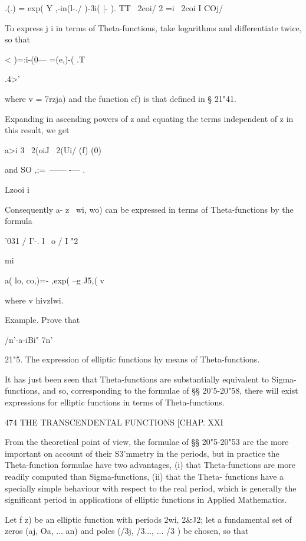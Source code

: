 .(.) = exp( Y ,-in(l-./ )-3i( |- ). TT \ 2coi/ 2 =i \ 2coi I COj/

To express j i in terms of Theta-functious, take logarithms and
differentiate twice, so that



 < )=:i-(0— =(e,)-( .T






.4>'

where v = 7rzja) and the function cf) is that defined in § 21"41.

Expanding in ascending powers of z and equating the terms independent
of z in this result, we get



a>i 3 \ 2(oiJ \ 2(Ui/ (f) (0)

and SO ,;=\ —— -— .

Lzooi i

Consequently a- z \ wi, wo) can be expressed in terms of
Theta-functions by the formula

'031 / I'-. l \ o / I "2



mi



a( lo, co,)=- ,exp( --g J5,( v

where v hivzlwi.

Example. Prove that

/n'-a-iBi" 7n'\

21"5. The expression of elliptic functions hy means of
Theta-functions.

It has just been seen that Theta-functions are substantially
equivalent to Sigma-functions, and so, corresponding to the formulae
of §§ 20'5-20"58, there will exist expressions for elliptic functions
in terms of Theta-functions.



474 THE TRANSCENDENTAL FUNCTIONS [CHAP. XXI

From the theoretical point of view, the formulae of §§ 20"5-20"53 are
the more important on account of their S3'mmetry in the periods, but
in practice the Theta-function formulae have two advantages, (i) that
Theta-functions are more readily computed than Sigma-functions, (ii)
that the Theta- functions have a specially simple behaviour with
respect to the real period, which is generally the significant period
in applications of elliptic functions in Applied Mathematics.

Let f z) be an elliptic function with periods 2wi, 2\&J2; let a
fundamental set of zeros (aj, Oa, ... an) and poles (/3j, /3..., ...
/3 ) be chosen, so that



